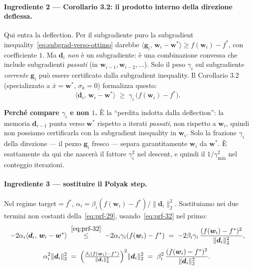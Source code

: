 \documentclass[11pt,a4paper]{article}
\theoremstyle{definition}
\newcommand{\w}{\bm{w}}
\newcommand{\g}{\bm{g}}
\newcommand{\dvec}{\bm{d}}
\newcommand{\wstar}{\w^{*}}
\newcommand{\fstar}{f^{*}}
\newcommand{\gmin}{\gamma_{\min}}
\newcommand{\inner}[2]{\langle #1,\, #2\rangle}
\newcommand{\norm}[1]{\lVert #1\rVert}
\begin{document}
\paragraph{Ingrediente 2 --- Corollario 3.2: il prodotto interno della direzione deflessa.}
Qui entra la deflection. Per il subgradiente puro la subgradient
inequality~\eqref{eq:subgrad-verso-ottimo} darebbe $\inner{\g_i}{\w_i-\wstar}\ge f(\w_i)-\fstar$,
con coefficiente $1$. Ma $\dvec_i$ \emph{non} è un subgradiente: è una combinazione convessa
che include subgradienti \emph{passati} (in $\w_{i-1},\w_{i-2},\dots$). Solo il peso $\gamma_i$
sul subgradiente \emph{corrente} $\g_i$ può essere certificato dalla subgradient inequality.
Il Corollario 3.2 (specializzato a $\bar x=\wstar$, $\sigma_k=0$) formalizza questo:
\begin{equation}\label{eq:prf-32}
\inner{\dvec_i}{\w_i-\wstar} \;\ge\; \gamma_i\,\big(f(\w_i)-\fstar\big).
\end{equation}

\begin{keybox}
\textbf{Perché compare $\gamma_i$ e non $1$.} È la ``perdita indotta dalla deflection'': la
memoria $\dvec_{i-1}$ punta verso $\wstar$ rispetto a iterati \emph{passati}, non rispetto a
$\w_i$, quindi non possiamo certificarla con la subgradient inequality in $\w_i$. Solo la
frazione $\gamma_i$ della direzione --- il pezzo $\g_i$ fresco --- separa garantitamente $\w_i$
da $\wstar$. È esattamente da qui che nascerà il fattore $\gamma_i^2$ nel descent, e quindi il
$1/\gmin^2$ nel conteggio iterazioni.
\end{keybox}

\paragraph{Ingrediente 3 --- sostituire il Polyak step.} Nel regime target$=\fstar$,
$\alpha_i=\beta_i(f(\w_i)-\fstar)/\norm{\dvec_i}_2^2$. Sostituiamo nei due termini non costanti
della~\eqref{eq:prf-29}, usando~\eqref{eq:prf-32} nel primo:
\begin{align}
-2\alpha_i\inner{\dvec_i}{\w_i-\wstar}
&\;\overset{\eqref{eq:prf-32}}{\le}\; -2\alpha_i\gamma_i(f(\w_i)-\fstar)
\;=\; -2\beta_i\gamma_i\,\frac{(f(\w_i)-\fstar)^2}{\norm{\dvec_i}_2^2}, \label{eq:prf-a}\\[2pt]
\alpha_i^2\norm{\dvec_i}_2^2
&\;=\; \Big(\tfrac{\beta_i(f(\w_i)-\fstar)}{\norm{\dvec_i}_2^2}\Big)^2\norm{\dvec_i}_2^2
\;=\; \beta_i^2\,\frac{(f(\w_i)-\fstar)^2}{\norm{\dvec_i}_2^2}. \label{eq:prf-b}
\end{align}
\end{document}
